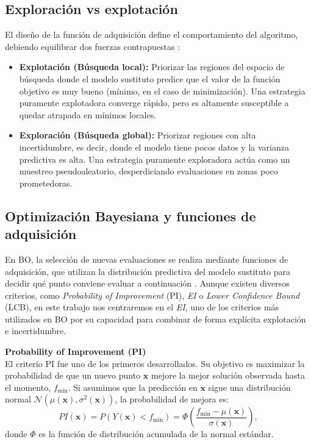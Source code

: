 \subsection{Exploración vs explotación}
El diseño de la función de adquisición define el comportamiento del algoritmo, debiendo equilibrar dos fuerzas contrapuestas \cite{jiang2020surrogate}:
\begin{itemize}
    \item \textbf{Explotación (Búsqueda local):} Priorizar las regiones del espacio de búsqueda donde el modelo sustituto predice que el valor de la función objetivo es muy bueno (mínimo, en el caso de minimización). Una estrategia puramente explotadora converge rápido, pero es altamente susceptible a quedar atrapada en mínimos locales.
    \item \textbf{Exploración (Búsqueda global):} Priorizar regiones con alta incertidumbre, es decir, donde el modelo tiene pocos datos y la varianza predictiva es alta. Una estrategia puramente exploradora actúa como un muestreo pseudoaleatorio, desperdiciando evaluaciones en zonas poco prometedoras.
\end{itemize}

\subsection{Optimización Bayesiana y funciones de adquisición}
\label{sec:optimizacion_bayesiana_adquisicion}

En BO, la selección de nuevas evaluaciones se realiza mediante
funciones de adquisición, que utilizan la distribución predictiva del modelo sustituto para
decidir qué punto conviene evaluar a continuación \cite{jones1998efficient}. Aunque existen
diversos criterios, como \textit{Probability of Improvement} (PI), \textit{EI} o \textit{Lower Confidence Bound} (LCB), en este trabajo nos centraremos en el
\textit{EI}, uno de los criterios más utilizados en BO
por su capacidad para combinar de forma explícita explotación e incertidumbre.

\vspace{0.3cm}
\noindent\textbf{Probability of Improvement (PI)} \\

El criterio PI fue uno de los primeros desarrollados. Su objetivo es maximizar la probabilidad
de que un nuevo punto \(\bm{x}\) mejore la mejor solución observada hasta el momento,
\(f_{\min}\). Si asumimos que la predicción en \(\bm{x}\) sigue una distribución normal
\(\mathcal{N}(\mu(\bm{x}), \sigma^2(\bm{x}))\), la probabilidad de mejora es:
\[
PI(\bm{x})
=
P(Y(\bm{x}) < f_{\min})
=
\Phi\left(
\frac{f_{\min}-\mu(\bm{x})}{\sigma(\bm{x})}
\right),
\]
donde \(\Phi\) es la función de distribución acumulada de la normal estándar.

